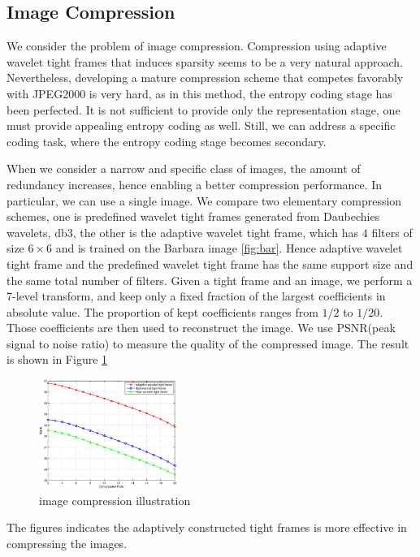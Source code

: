 \documentclass[a4paper]{article}
\begin{document}
\subsection{Image Compression}
 We consider the problem of image compression. Compression using adaptive wavelet tight frames that induces sparsity seems to be a very natural approach. Nevertheless, developing a mature compression scheme that competes favorably with JPEG2000 is very hard, as in this method, the entropy coding stage has been perfected. It is not sufficient to provide only the representation stage, one must provide appealing entropy coding as well. Still, we can address a specific coding task, where the entropy coding stage becomes secondary. 

When we consider a narrow and specific class of images, the amount of redundancy increases, hence enabling a better compression performance. In particular, we can use a single image. We compare two elementary compression schemes, one is predefined wavelet tight frames generated from Daubechies wavelets, db3, the other is the adaptive wavelet tight frame, which has $4$ filters of size $6\times 6$ and is trained on the Barbara image \ref{fig:bar}.  Hence adaptive wavelet tight frame and the predefined wavelet tight frame has the same support size and the same total number of filters.  Given a tight frame and an image, we perform a 7-level transform, and keep only a fixed fraction of the largest coefficients in absolute value. The proportion of kept coefficients ranges from $1/2$ to $1/20$. Those coefficients are then used to reconstruct the image. We use PSNR(peak signal to noise ratio) to measure the quality of the compressed image. The result is shown in Figure \ref{fig:3}
\begin{figure}[h!]
    \centering
    \includegraphics[width=0.4\textwidth]{figure51.eps}
    \caption{image compression illustration}
    \label{fig:3}
\end{figure}
The figures indicates the adaptively constructed tight frames is more effective in compressing the images. 
\end{document}
